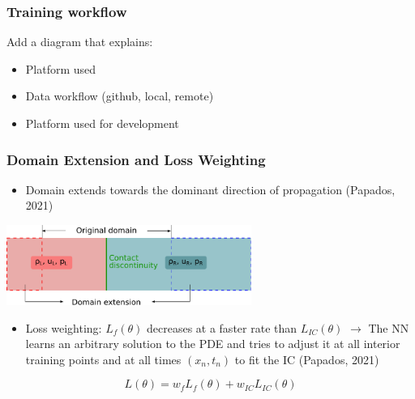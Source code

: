 \documentclass[aspectratio=169]{beamer}
\begin{document}
\begin{frame}\frametitle{Training workflow}
	
	Add a diagram that explains:
	\begin{itemize}
		\item Platform used
		\item Data workflow (github, local, remote)
		\item Platform used for development
				
	\end{itemize}
	
	
\end{frame}


\begin{frame}\frametitle{Domain Extension and Loss Weighting}
	\begin{itemize}
		\item Domain extends towards the dominant direction of propagation \tiny (Papados, 2021) 
	\end{itemize}
		
	\begin{center}
		\includegraphics[width=0.6\textwidth]{Figures/domain_extension.pdf}
	\end{center}
	
	\begin{itemize}
		\item Loss weighting: $L_f(\theta)$ decreases at a faster rate than $L_{IC}(\theta)$ $\rightarrow$ The NN learns an arbitrary solution to the PDE and tries to adjust it at all interior training points and at all times $(x_n, t_n)$ to fit the IC \tiny (Papados, 2021)
	\end{itemize}
	
	\begin{equation*}
		L(\theta) = w_f L_f (\theta) + w_{IC} L_{IC} (\theta)
	\end{equation*}
	
	
\end{frame}
\end{document}
